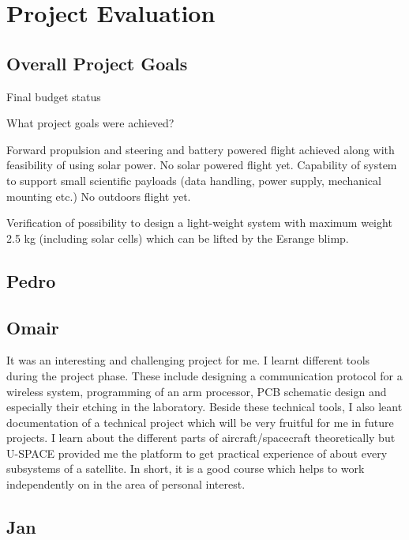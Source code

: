 \newpage
\chapter{Project Evaluation}
\label{chap:evaluation}

\section{Overall Project Goals}

Final budget status

What project goals were achieved?

Forward propulsion and steering and battery powered flight achieved along with feasibility of using solar power. No solar powered flight yet. Capability of system to support small scientific payloads (data handling, power supply, mechanical mounting etc.) No outdoors flight yet.

Verification of possibility to design a light-weight system with maximum weight 2.5 kg (including solar cells) which can be lifted by the Esrange blimp.

\section{Pedro}


\section{Omair}
It was an interesting and challenging project for me. I learnt different tools during the project phase. These include designing a communication protocol for a wireless system, programming of an arm processor, \ac{PCB} schematic design and especially their etching in the laboratory. Beside these technical tools, I also leant documentation of a technical project which will be very fruitful for me in future projects. I learn about the different parts of aircraft/spacecraft theoretically but \ac{U-SPACE} provided me the platform to get practical experience of about every subsystems of a satellite. In short, it is a good course which helps to work independently on in the area of personal interest. 

\section{Jan}


